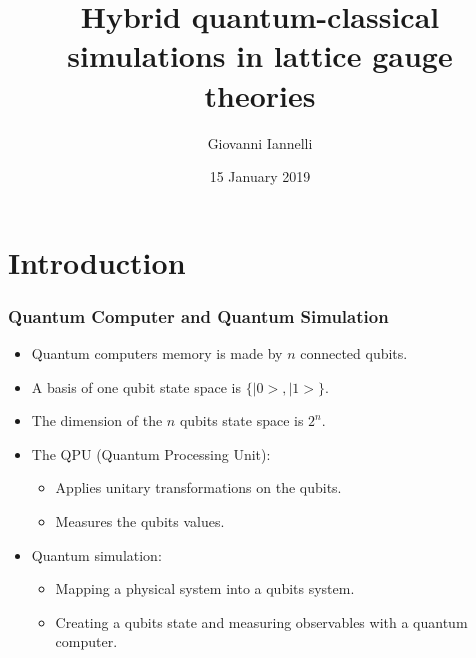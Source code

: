 \documentclass[10pt,t,xcolor=dvipsnames,aspectratio=169]{beamer}
\title[Fellow project presentation]{Hybrid quantum-classical simulations in lattice gauge theories}
\author{Giovanni Iannelli}
\institute{Humboldt University of Berlin}
\date{15 January 2019}
\newlength\leftsidebar
\begin{document}
\leftsidebar
\begin{frame}[plain,t]
\titlepage
\end{frame}
\hoffset=0in %


\section{Introduction}


\begin{frame}
    \frametitle{Quantum Computer and Quantum Simulation}
    \begin{itemize}
        \item
            Quantum computers memory is made by $n$ connected qubits.
        \item
            A basis of one qubit state space is $\{|0>,|1>\}$.
        \item
            The dimension of the $n$ qubits state space is $2^n$.
        \item
            The QPU (Quantum Processing Unit):
            \begin{itemize}
                \item Applies unitary transformations on the qubits.
                \item Measures the qubits values.
            \end{itemize}
        \item
            Quantum simulation:
            \begin{itemize}
                \item
                    Mapping a physical system into a qubits system.
                \item
                    Creating a qubits state and measuring observables with a quantum computer.
            \end{itemize}
    \end{itemize}
\end{frame}
\end{document}
